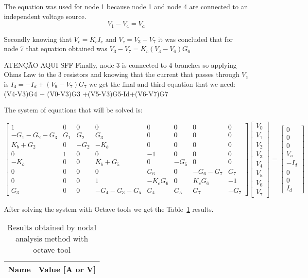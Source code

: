 The equation was used for node 1 because node 1 and node 4 are connected to an independent voltage source.
\begin{equation}
V_1-V_4=V_a 
\end{equation}

Secondly knowing that $V_c=K_c I_c$ and $V_c=V_3 - V_7$  it was concluded that for node 7 that equation obtained was $V_3 - V_7 = K_c (V_3 - V_6) G_6$

ATENÇÃO AQUI SFF
Finally, node 3 is connected to 4 branches so applying Ohms Law to the 3 resistors and knowing that the current that passes through $V_c$ is $I_4=-I_d+(V_6-V_7)G_7$ we get the final and third equation that we need: (V4-V3)G4 + (V0-V3)G3 +(V5-V3)G5-Id+(V6-V7)G7 %

The system of equations that will be solved is:


\begin{equation}
\begin{bmatrix} 
1 & 0 & 0 & 0 & 0 & 0 & 0 & 0 \\
-G_1 - G_2 - G_3 & G_1 & G_2 & G_3 & 0 & 0 & 0 & 0 \\
K_b + G_2 & 0 & -G_2 & -K_b & 0 & 0 & 0 & 0 \\
0 & 1 & 0 & 0 & -1 & 0 & 0 & 0 \\
-K_b & 0 & 0 & K_b + G_5 & 0 & -G_5 & 0 & 0 \\
0 & 0 & 0 & 0 & G_6 & 0 & -G_6 - G_7 & G_7 \\
0 & 0 & 0 & 1 & -K_c G_6 & 0 & K_c G_6 & -1 \\
G_3 & 0 & 0 & -G_4 - G_3 - G_5 & G_4 & G_5 & G_7 & -G_7
\end{bmatrix} 
\begin{bmatrix} 
V_0 \\ 
V_1 \\ 
V_2 \\ 
V_3 \\ 
V_4 \\ 
V_5 \\ 
V_6 \\ 
V_7
\end{bmatrix} =
\begin{bmatrix} 
0\\ 
0 \\ 
0 \\ 
V_a \\
-I_d \\ 
0 \\ 
0 \\ 
I_d
\end{bmatrix}
\end{equation}


After solving the system with Octave tools we get the Table~\ref{tab:nodal} results.

\begin{table}[h]
  \centering
  \begin{tabular}{|l|r|}
    \hline    
    {\bf Name} & {\bf Value [A or V]} \\ \hline
    
  \end{tabular}
  \caption{Results obtained by nodal analysis method with octave tool}
  \label{tab:nodal}
\end{table}



